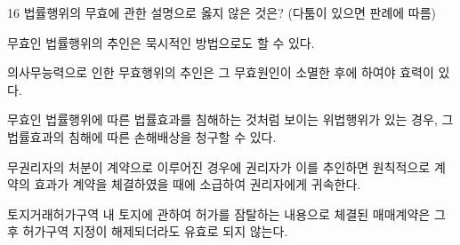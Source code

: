 \begin{question}{16}
법률행위의 무효에 관한 설명으로 옳지 않은 것은? (다툼이 있으면 판례에 따름)
\begin{choices}
  \item 무효인 법률행위의 추인은 묵시적인 방법으로도 할 수 있다.
  \item 의사무능력으로 인한 무효행위의 추인은 그 무효원인이 소멸한 후에 하여야 효력이 있다.
  \item 무효인 법률행위에 따른 법률효과를 침해하는 것처럼 보이는 위법행위가 있는 경우, 그 법률효과의 침해에 따른 손해배상을 청구할 수 있다.
  \item 무권리자의 처분이 계약으로 이루어진 경우에 권리자가 이를 추인하면 원칙적으로 계약의 효과가 계약을 체결하였을 때에 소급하여 권리자에게 귀속한다.
  \item 토지거래허가구역 내 토지에 관하여 허가를 잠탈하는 내용으로 체결된 매매계약은 그 후 허가구역 지정이 해제되더라도 유효로 되지 않는다.
\end{choices}
\end{question}
